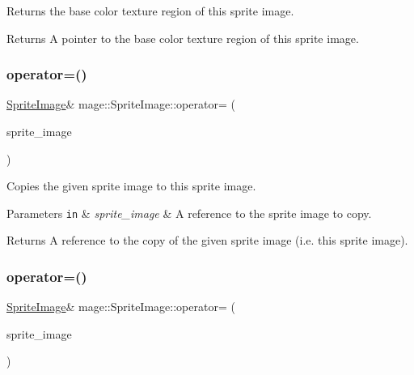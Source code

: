 Returns the base color texture region of this sprite image.

\begin{DoxyReturn}{Returns}
A pointer to the base color texture region of this sprite image. 
\end{DoxyReturn}
\hypertarget{classmage_1_1_sprite_image_a20d8e8272cf62599f6c0e4b1ff4f3586}{}\label{classmage_1_1_sprite_image_a20d8e8272cf62599f6c0e4b1ff4f3586} 
\subsubsection{\texorpdfstring{operator=()}{operator=()}\hspace{0.1cm}{\footnotesize\ttfamily [1/2]}}
{\footnotesize\ttfamily \hyperlink{classmage_1_1_sprite_image}{Sprite\+Image}\& mage\+::\+Sprite\+Image\+::operator= (\begin{DoxyParamCaption}\item[{const \hyperlink{classmage_1_1_sprite_image}{Sprite\+Image} \&}]{sprite\+\_\+image }\end{DoxyParamCaption})\hspace{0.3cm}{\ttfamily [delete]}}

Copies the given sprite image to this sprite image.


\begin{DoxyParams}[1]{Parameters}
\mbox{\tt in}  & {\em sprite\+\_\+image} & A reference to the sprite image to copy. \\
\hline
\end{DoxyParams}
\begin{DoxyReturn}{Returns}
A reference to the copy of the given sprite image (i.\+e. this sprite image). 
\end{DoxyReturn}
\hypertarget{classmage_1_1_sprite_image_a9f83e728a93550f6b20bb4d500483171}{}\label{classmage_1_1_sprite_image_a9f83e728a93550f6b20bb4d500483171} 
\subsubsection{\texorpdfstring{operator=()}{operator=()}\hspace{0.1cm}{\footnotesize\ttfamily [2/2]}}
{\footnotesize\ttfamily \hyperlink{classmage_1_1_sprite_image}{Sprite\+Image}\& mage\+::\+Sprite\+Image\+::operator= (\begin{DoxyParamCaption}\item[{\hyperlink{classmage_1_1_sprite_image}{Sprite\+Image} \&\&}]{sprite\+\_\+image }\end{DoxyParamCaption})\hspace{0.3cm}{\ttfamily [delete]}}

